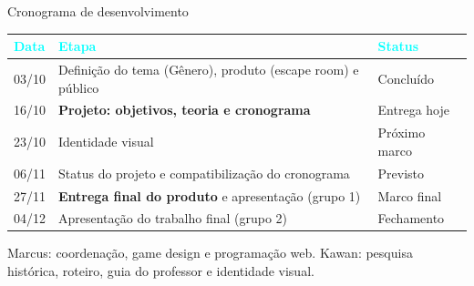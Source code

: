 \documentclass[aspectratio=169, 10pt, t]{beamer}
\newcommand{\muted}[1]{{\color{TextMuted}#1}}
\begin{document}
\begin{frame}{Cronograma de desenvolvimento}
  \footnotesize
  \renewcommand{\arraystretch}{1.25}
  \begin{tabularx}{\textwidth}{l X l}
    \toprule
    \textcolor{Cyan}{Data} & \textcolor{Cyan}{Etapa} & \textcolor{Cyan}{Status} \\
    \midrule
    03/10 & Definição do tema (Gênero), produto (escape room) e público & Concluído \\
    16/10 & \textbf{Projeto: objetivos, teoria e cronograma} & Entrega hoje \\
    23/10 & Identidade visual & Próximo marco \\
    06/11 & Status do projeto e compatibilização do cronograma & Previsto \\
    27/11 & \textbf{Entrega final do produto} e apresentação (grupo 1) & Marco final \\
    04/12 & Apresentação do trabalho final (grupo 2) & Fechamento \\
    \bottomrule
  \end{tabularx}
  \vspace{0.3em}

  {\scriptsize\muted{Marcus: coordenação, game design e programação web. Kawan: pesquisa histórica, roteiro, guia do professor e identidade visual.}}
\end{frame}
\end{document}
